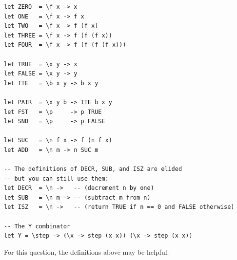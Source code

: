 \documentclass[addpoints]{exam}
\begin{document}
\begin{questions}
\newpage

\begin{verbatim}
let ZERO  = \f x -> x
let ONE   = \f x -> f x
let TWO   = \f x -> f (f x)
let THREE = \f x -> f (f (f x))
let FOUR  = \f x -> f (f (f (f x)))

let TRUE  = \x y -> x
let FALSE = \x y -> y
let ITE   = \b x y -> b x y

let PAIR  = \x y b -> ITE b x y
let FST   = \p     -> p TRUE
let SND   = \p     -> p FALSE

let SUC   = \n f x -> f (n f x)
let ADD   = \n m -> n SUC m

-- The definitions of DECR, SUB, and ISZ are elided
-- but you can still use them:
let DECR  = \n ->   -- (decrement n by one)
let SUB   = \n m -> -- (subtract m from n)
let ISZ   = \n ->   -- (return TRUE if n == 0 and FALSE otherwise)

-- The Y combinator
let Y = \step -> (\x -> step (x x)) (\x -> step (x x))
\end{verbatim}

\question For this question, the definitions above may be helpful.

\end{questions}
\end{document}
